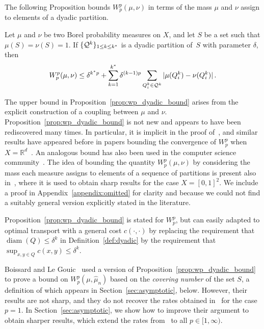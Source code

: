 \documentclass[sts]{imsart}
\newcommand{\RR}{\mathbb{R}}
\DeclareMathOperator{\diam}{diam}
\begin{document}
The following Proposition bounds $W_p^p(\mu, \nu)$ in terms of the mass $\mu$ and $\nu$ assign to elements of a dyadic partition.
\begin{proposition}\label{prop:wp_dyadic_bound}
Let $\mu$ and $\nu$ be two Borel probability measures on $X$, and let $S$ be a set such that $\mu(S) = \nu(S) = 1$.
If $\{\mathcal{Q}^k\}_{1 \leq k \leq k^*}$ is a dyadic partition of~$S$ with parameter $\delta$, then
\begin{equation*}
W_p^p(\mu, \nu) \leq \delta^{k^* p} + \sum_{k = 1}^{k^*} \delta^{(k-1)p} \sum_{Q_i^k \in \mathcal{Q}^k} |\mu(Q_i^k) - \nu(Q_i^k)|\,.
\end{equation*}
\end{proposition}
The upper bound in Proposition~\ref{prop:wp_dyadic_bound} arises from the explicit construction of a coupling between $\mu$ and $\nu$.
Proposition~\ref{prop:wp_dyadic_bound} is not new and appears to have been rediscovered many times.
In particular, it is implicit in the proof of~\cite[Proposition~1.1]{BoiLeg14}, and similar results have appeared before in papers bounding the convergence of $W_p^p$ when $X = \RR^d$~\cite{DerSchSch13,FouGui15}.
An analogous bound has also been used in the computer science community~\cite{Ind03,BaNguNgu11}.
The idea of bounding the quantity $W_p^p(\mu, \nu)$ by considering the mass each measure assigns to elements of a sequence of partitions is present also in~\cite{AjtKomTus84}, where it is used to obtain sharp results for the case $X = [0, 1]^2$.
We include a proof in Appendix~\ref{appendix:omitted} for clarity and because we could not find a suitably general version explicitly stated in the literature.

Proposition~\ref{prop:wp_dyadic_bound} is stated for $W_p^p$, but can easily adapted to optimal transport with a general cost $c(\cdot, \cdot)$ by replacing the requirement that $\diam(Q) \leq \delta^k$ in Definition~\ref{def:dyadic} by the requirement that $\sup_{x, y \in Q} c(x, y) \leq \delta^k$.

Boissard and Le Gouic~\cite{BoiLeg14} used a version of Proposition~\ref{prop:wp_dyadic_bound} to prove a bound on $W_p^p(\mu, \hat \mu_n)$ based on the \emph{covering number} of the set $S$, a definition of which appears in Section~\ref{sec:asymptotic}, below.
However, their results are not sharp, and they do not recover the rates obtained in~\cite{Dud68} for the case $p = 1$.
In Section~\ref{sec:asymptotic}, we show how to improve their argument to obtain sharper results, which extend the rates from~\cite{Dud68} to all $p \in [1, \infty)$.
\end{document}
